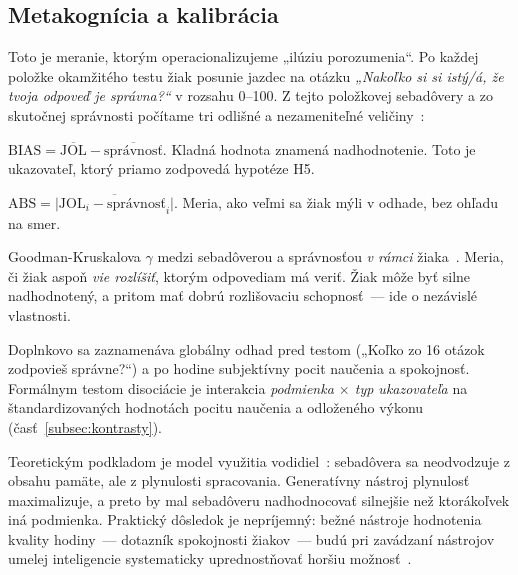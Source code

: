 \subsection{Metakognícia a kalibrácia}
\label{subsec:metakognicia}

Toto je meranie, ktorým operacionalizujeme „ilúziu porozumenia“. Po každej položke okamžitého testu žiak posunie jazdec na otázku \emph{„Nakoľko si si istý/á, že tvoja odpoveď je správna?“} v rozsahu 0--100. Z tejto položkovej sebadôvery a zo skutočnej správnosti počítame tri odlišné a nezameniteľné veličiny~\cite{schraw2009conceptual}:

\begin{description}[leftmargin=2.4cm, style=nextline, nosep]
    \item[Skreslenie] $\mathrm{BIAS}=\overline{\mathrm{JOL}}-\overline{\text{správnosť}}$. Kladná hodnota znamená nadhodnotenie. Toto je ukazovateľ, ktorý priamo zodpovedá hypotéze H5.
    \item[Absolútna presnosť] $\mathrm{ABS}=\overline{\lvert \mathrm{JOL}_i-\text{správnosť}_i\rvert}$. Meria, ako veľmi sa žiak mýli v odhade, bez ohľadu na smer.
    \item[Rozlišovacia schopnosť] Good\-man\--Krus\-ka\-lo\-va $\gamma$ medzi se\-ba\-dô\-ve\-rou a správ\-nos\-ťou \emph{v rámci} žiaka~\cite{nelson1984gamma}. Meria, či žiak aspoň \emph{vie rozlíšiť}, ktorým odpovediam má veriť. Žiak môže byť silne nadhodnotený, a pritom mať dobrú rozlišovaciu schopnosť~--- ide o nezávislé vlastnosti.
\end{description}

Doplnkovo sa zaznamenáva globálny odhad pred testom („Koľko zo 16 otázok zodpovieš správne?“) a po hodine subjektívny pocit naučenia a spokojnosť. Formálnym testom disociácie je interakcia \emph{podmienka $\times$ typ ukazovateľa} na štandardizovaných hodnotách pocitu naučenia a odloženého výkonu (časť~\ref{subsec:kontrasty}).

Teoretickým podkladom je model využitia vodidiel~\cite{koriat1997monitoring}: sebadôvera sa neodvodzuje z obsahu pamäte, ale z plynulosti spracovania. Generatívny nástroj plynulosť maximalizuje, a preto by mal sebadôveru nadhodnocovať silnejšie než ktorákoľvek iná podmienka. Praktický dôsledok je nepríjemný: bežné nástroje hodnotenia kvality hodiny~--- dotazník spokojnosti žiakov~--- budú pri zavádzaní nástrojov umelej inteligencie systematicky uprednostňovať horšiu možnosť~\cite{deslauriers2019feeling,dunlosky2012overconfidence}.

